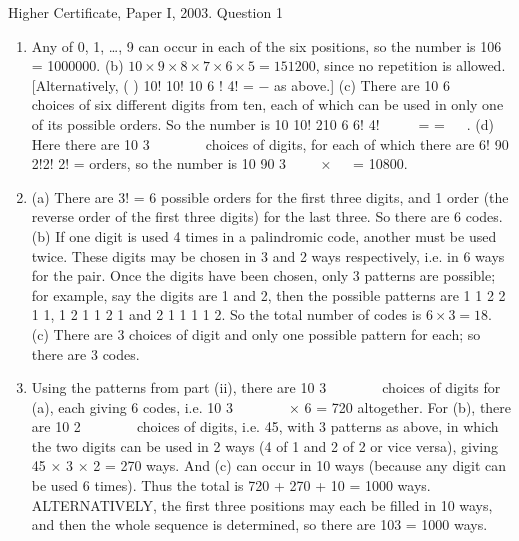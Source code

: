 \documentclass[a4paper,12pt]{article}
\begin{document}
Higher Certificate, Paper I, 2003. Question 1
\begin{enumerate}
\item Any of 0, 1, …, 9 can occur in each of the six positions, so the number
is 106 = 1000000.
(b) $10 × 9 × 8 × 7 × 6 × 5 = 151200$, since no repetition is allowed.
[Alternatively, ( )
10! 10!
10 6 ! 4!
=
−
as above.]
(c) There are
10
6
 
 
 
choices of six different digits from ten, each of which
can be used in only one of its possible orders. So the number is
10 10! 210
6 6! 4!
 
  = =
 
.
(d) Here there are
10
3
 
 
 
choices of digits, for each of which there are
6! 90
2!2! 2!
= orders, so the number is
10
90
3
 
 ×
 
= 10800.
\item  (a) There are 3! = 6 possible orders for the first three digits, and 1 order
(the reverse order of the first three digits) for the last three. So there
are 6 codes.
(b) If one digit is used 4 times in a palindromic code, another must be used
twice. These digits may be chosen in 3 and 2 ways respectively, i.e. in
6 ways for the pair. Once the digits have been chosen, only 3 patterns
are possible; for example, say the digits are 1 and 2, then the possible
patterns are 1 1 2 2 1 1, 1 2 1 1 2 1 and 2 1 1 1 1 2. So the total
number of codes is $6 × 3 = 18$.
(c) There are 3 choices of digit and only one possible pattern for each; so
there are 3 codes.
\item  Using the patterns from part (ii), there are
10
3
 
 
 
choices of digits for (a), each
giving 6 codes, i.e.
10
3
 
 
 
× 6 = 720 altogether. For (b), there are
10
2
 
 
 
choices
of digits, i.e. 45, with 3 patterns as above, in which the two digits can be used
in 2 ways (4 of 1 and 2 of 2 or vice versa), giving 45 × 3 × 2 = 270 ways. And
(c) can occur in 10 ways (because any digit can be used 6 times). Thus the
total is 720 + 270 + 10 = 1000 ways.
ALTERNATIVELY, the first three positions may each be filled in 10 ways,
and then the whole sequence is determined, so there are 103 = 1000 ways.
\end{enumerate}
\end{document}
